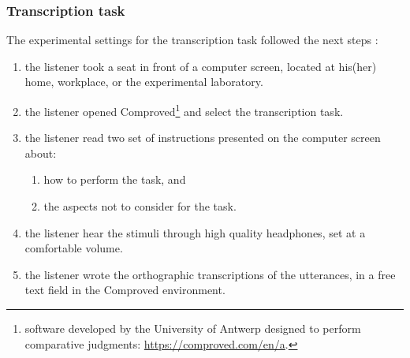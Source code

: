 \subsubsection{Transcription task} \label{appA:transcription}
%
The experimental settings for the transcription task followed the next steps \citep{Boonen_et_al_2020, Boonen_et_al_2021}:
%
\begin{enumerate} \itemsep1pt
	\item the listener took a seat in front of a computer screen, located at his(her) home, workplace, or the experimental laboratory.
	\item the listener opened Comproved\footnote{software developed by the University of Antwerp designed to perform comparative judgments: \url{https://comproved.com/en/a}.} and select the transcription task.
	\item the listener read two set of instructions presented on the computer screen about:
	\begin{enumerate}
		\item how to perform the task, and
		\item the aspects not to consider for the task.
	\end{enumerate}
	\item the listener hear the stimuli through high quality headphones, set at a comfortable volume.
	\item the listener wrote the orthographic transcriptions of the utterances, in a free text field in the Comproved environment.
\end{enumerate}
%
%
